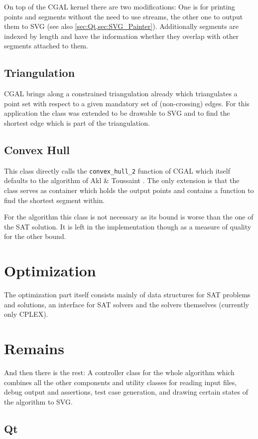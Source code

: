 On top of the CGAL kernel there are two modifications: One is for
printing points and segments without the need to use streams, the
other one to output them to SVG (see also
\cref{sec:Qt,sec:SVG_Painter}). Additionally segments are indexed by
length and have the information whether they overlap with other
segments attached to them.

\subsection{Triangulation}
CGAL brings along a constrained triangulation already
\cite{cgal_manual_constrained_triangulation}
which triangulates a point set with respect to a given mandatory set
of (non-crossing) edges. For this application the class was extended
to be drawable to SVG and to find the shortest edge which is part of
the triangulation.

\subsection{Convex Hull}
This class directly calls the \verb|convex_hull_2| function of CGAL
\cite{cgal_manual_convex_hull} which itself defaults to the algorithm
of Akl \& Toussaint \cite{convex_hull}. The only extension is that
the class serves as container
which holds the output points and contains a function to find the 
shortest segment within.

For the algorithm this class is not necessary as its bound is worse
than the one of the SAT solution. It is left in the implementation
though as a measure of quality for the other bound.

\section{Optimization}
The optimization part itself consists mainly of data structures for
SAT problems and solutions, an interface for SAT solvers and the
solvers themselves (currently only CPLEX).

\section{Remains}
And then there is the rest: A controller
class for the whole algorithm which combines all the other components
and utility classes for reading input files, debug
output and assertions, test case generation, and drawing certain 
states of the algorithm to SVG.

\subsection{Qt}\label{sec:Qt}
